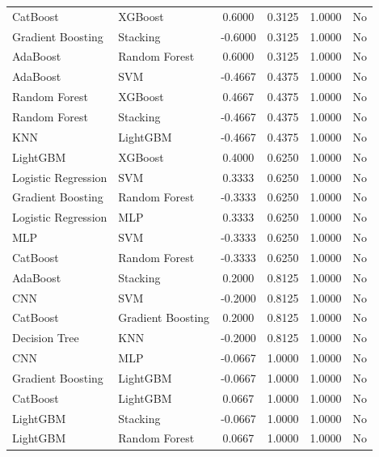 \documentclass[a4paper,fleqn]{cas-sc}
\begin{document}
{\begin{longtable}{l l c c c c}
CatBoost            & XGBoost             &  0.6000 & 0.3125 & 1.0000 & No \\
Gradient Boosting   & Stacking            & -0.6000 & 0.3125 & 1.0000 & No \\
AdaBoost            & Random Forest       &  0.6000 & 0.3125 & 1.0000 & No \\
AdaBoost            & SVM                 & -0.4667 & 0.4375 & 1.0000 & No \\
Random Forest       & XGBoost             &  0.4667 & 0.4375 & 1.0000 & No \\
Random Forest       & Stacking            & -0.4667 & 0.4375 & 1.0000 & No \\
KNN                 & LightGBM            & -0.4667 & 0.4375 & 1.0000 & No \\
LightGBM            & XGBoost             &  0.4000 & 0.6250 & 1.0000 & No \\
Logistic Regression & SVM                 &  0.3333 & 0.6250 & 1.0000 & No \\
Gradient Boosting   & Random Forest       & -0.3333 & 0.6250 & 1.0000 & No \\
Logistic Regression & MLP                 &  0.3333 & 0.6250 & 1.0000 & No \\
MLP                 & SVM                 & -0.3333 & 0.6250 & 1.0000 & No \\
CatBoost            & Random Forest       & -0.3333 & 0.6250 & 1.0000 & No \\
AdaBoost            & Stacking            &  0.2000 & 0.8125 & 1.0000 & No \\
CNN                 & SVM                 & -0.2000 & 0.8125 & 1.0000 & No \\
CatBoost            & Gradient Boosting   &  0.2000 & 0.8125 & 1.0000 & No \\
Decision Tree       & KNN                 & -0.2000 & 0.8125 & 1.0000 & No \\
CNN                 & MLP                 & -0.0667 & 1.0000 & 1.0000 & No \\
Gradient Boosting   & LightGBM            & -0.0667 & 1.0000 & 1.0000 & No \\
CatBoost            & LightGBM            &  0.0667 & 1.0000 & 1.0000 & No \\
LightGBM            & Stacking            & -0.0667 & 1.0000 & 1.0000 & No \\
LightGBM            & Random Forest       &  0.0667 & 1.0000 & 1.0000 & No \\


\end{longtable}}
\end{document}
